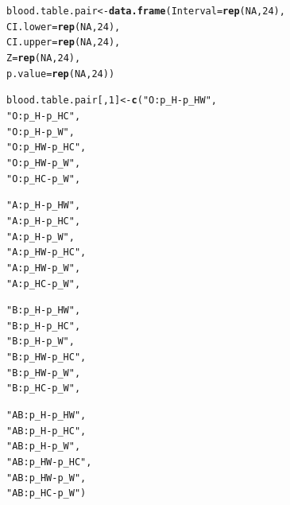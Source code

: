 \documentclass{article}\usepackage[]{graphicx}\usepackage[]{color}
\makeatletter
\newcommand{\hlnum}[1]{\textcolor[rgb]{0.686,0.059,0.569}{#1}}%
\newcommand{\hlstr}[1]{\textcolor[rgb]{0.192,0.494,0.8}{#1}}%
\newcommand{\hlstd}[1]{\textcolor[rgb]{0.345,0.345,0.345}{#1}}%
\newcommand{\hlkwb}[1]{\textcolor[rgb]{0.69,0.353,0.396}{#1}}%
\newcommand{\hlkwc}[1]{\textcolor[rgb]{0.333,0.667,0.333}{#1}}%
\newcommand{\hlkwd}[1]{\textcolor[rgb]{0.737,0.353,0.396}{\textbf{#1}}}%
\newenvironment{kframe}{%
 \def\at@end@of@kframe{}%
 \ifinner\ifhmode%
  \def\at@end@of@kframe{\end{minipage}}%
  \begin{minipage}{\columnwidth}%
 \fi\fi%
 \def\FrameCommand##1{\hskip\@totalleftmargin \hskip-\fboxsep
 \colorbox{shadecolor}{##1}\hskip-\fboxsep
     \hskip-\linewidth \hskip-\@totalleftmargin \hskip\columnwidth}%
 \MakeFramed {\advance\hsize-\width
   \@totalleftmargin\z@ \linewidth\hsize
   \@setminipage}}%
 {\par\unskip\endMakeFramed%
 \at@end@of@kframe}
\newenvironment{knitrout}{}{} %
\makeatother
\begin{document}
\begin{knitrout}
\color{fgcolor}\begin{kframe}
\begin{alltt}
\hlstd{blood.table.pair} \hlkwb{<-} \hlkwd{data.frame}\hlstd{(}\hlkwc{Interval} \hlstd{=} \hlkwd{rep}\hlstd{(}\hlnum{NA}\hlstd{,}\hlnum{24}\hlstd{) ,}
                          \hlkwc{CI.lower} \hlstd{=} \hlkwd{rep}\hlstd{(}\hlnum{NA}\hlstd{,}\hlnum{24}\hlstd{) ,}
                          \hlkwc{CI.upper} \hlstd{=} \hlkwd{rep}\hlstd{(}\hlnum{NA}\hlstd{,}\hlnum{24}\hlstd{) ,}
                          \hlkwc{Z} \hlstd{=} \hlkwd{rep}\hlstd{(}\hlnum{NA}\hlstd{,}\hlnum{24}\hlstd{) ,}
                          \hlkwc{p.value} \hlstd{=} \hlkwd{rep}\hlstd{(}\hlnum{NA}\hlstd{,}\hlnum{24}\hlstd{))}

\hlstd{blood.table.pair[,}\hlnum{1}\hlstd{]} \hlkwb{<-} \hlkwd{c}\hlstd{(}\hlstr{"O:p_H - p_HW"}\hlstd{,}
                     \hlstr{"O:p_H - p_HC"}\hlstd{,}
                     \hlstr{"O:p_H - p_W"}\hlstd{,}
                     \hlstr{"O:p_HW - p_HC"}\hlstd{,}
                     \hlstr{"O:p_HW - p_W"}\hlstd{,}
                     \hlstr{"O:p_HC - p_W"}\hlstd{,}

                     \hlstr{"A:p_H - p_HW"}\hlstd{,}
                     \hlstr{"A:p_H - p_HC"}\hlstd{,}
                     \hlstr{"A:p_H - p_W"}\hlstd{,}
                     \hlstr{"A:p_HW - p_HC"}\hlstd{,}
                     \hlstr{"A:p_HW - p_W"}\hlstd{,}
                     \hlstr{"A:p_HC - p_W"}\hlstd{,}

                     \hlstr{"B:p_H - p_HW"}\hlstd{,}
                     \hlstr{"B:p_H - p_HC"}\hlstd{,}
                     \hlstr{"B:p_H - p_W"}\hlstd{,}
                     \hlstr{"B:p_HW - p_HC"}\hlstd{,}
                     \hlstr{"B:p_HW - p_W"}\hlstd{,}
                     \hlstr{"B:p_HC - p_W"}\hlstd{,}

                     \hlstr{"AB:p_H - p_HW"}\hlstd{,}
                     \hlstr{"AB:p_H - p_HC"}\hlstd{,}
                     \hlstr{"AB:p_H - p_W"}\hlstd{,}
                     \hlstr{"AB:p_HW - p_HC"}\hlstd{,}
                     \hlstr{"AB:p_HW - p_W"}\hlstd{,}
                     \hlstr{"AB:p_HC - p_W"}\hlstd{)}


\end{alltt}
\end{kframe}
\end{knitrout}
\end{document}
